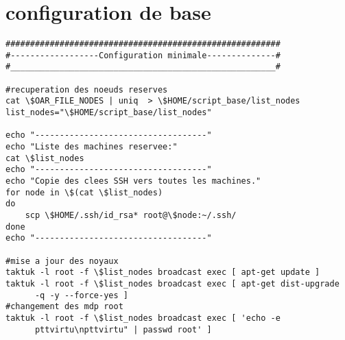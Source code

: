 \section{configuration de base}
\begin{lstlisting}
########################################################
#------------------Configuration minimale--------------#
#______________________________________________________#

#recuperation des noeuds reserves
cat \$OAR_FILE_NODES | uniq  > \$HOME/script_base/list_nodes
list_nodes="\$HOME/script_base/list_nodes"

echo "-----------------------------------"
echo "Liste des machines reservee:"
cat \$list_nodes
echo "-----------------------------------"
echo "Copie des clees SSH vers toutes les machines."
for node in \$(cat \$list_nodes)
do
	scp \$HOME/.ssh/id_rsa* root@\$node:~/.ssh/
done
echo "-----------------------------------"

#mise a jour des noyaux
taktuk -l root -f \$list_nodes broadcast exec [ apt-get update ]
taktuk -l root -f \$list_nodes broadcast exec [ apt-get dist-upgrade 
      -q -y --force-yes ]
#changement des mdp root
taktuk -l root -f \$list_nodes broadcast exec [ 'echo -e 
      pttvirtu\npttvirtu" | passwd root' ]
\end{lstlisting}
